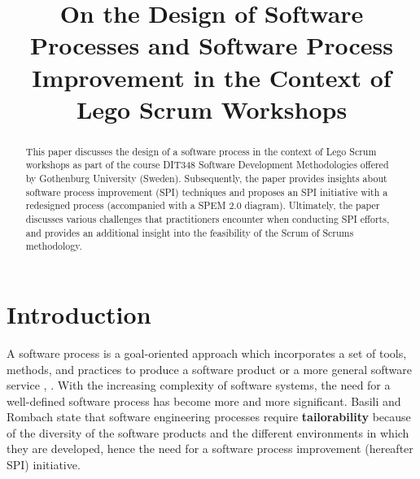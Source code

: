\documentclass[conference]{IEEEtran}
\begin{document}
\title{On the Design of Software Processes and Software Process Improvement in
the Context of Lego Scrum Workshops}

\author{
}

\maketitle

\begin{abstract}
This paper discusses the design of a software process in the context of Lego
Scrum workshops as part of the course DIT348 Software Development Methodologies
offered by Gothenburg University (Sweden). Subsequently, the paper provides
insights about software process improvement (SPI) techniques and proposes an
SPI initiative with a redesigned process (accompanied with a SPEM 2.0 diagram).
Ultimately, the paper discusses various challenges that practitioners encounter
when conducting SPI efforts, and provides an additional insight into the
feasibility of the Scrum of Scrums methodology.
\end{abstract}

\section{Introduction}


A software process is a goal-oriented approach which incorporates a set of
tools, methods, and practices to produce a software product or a more general
software service \cite{Munch2012}, \cite{Humphrey1989}. With the increasing
complexity of software systems, the need for a well-defined software process
has become more and more significant. Basili and Rombach \cite{Basili1988}
state that software engineering processes require \textbf{tailorability}
because of the diversity of the software products and the different
environments in which they are developed, hence the need for a software process
improvement (hereafter SPI) initiative.
\end{document}
